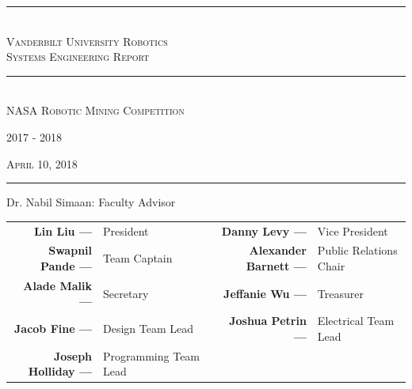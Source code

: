 \documentclass[12pt]{article}
\begin{document}
	\begin{titlepage}

\setlength{\parindent}{0cm}
\newcommand{\HRule}{\rule{\linewidth}{0.25mm}}

\vspace*{0.5in}

\vspace*{.125in}

\HRule \\[0.4cm]
	\Large\textsc{Vanderbilt University Robotics \\ Systems Engineering Report}

\HRule\\ [1.0cm]

\vspace*{0.0in}
\huge\textsc{NASA Robotic Mining Competition}

\vspace*{0.125in}

\LARGE{\textsc{2017 - 2018}}

\vspace*{0.2in}

\large{\textsc{April 10, 2018}}

\vspace*{0.1in}

\begin{center}
\rule{4.5in}{0.4pt}
\end{center}
\begin{center}
Dr. Nabil Simaan: Faculty Advisor \\
\end{center}

\vspace*{0.2in}

\centering
\small{
 \begin{tabular}{r l r l}
  \textbf{Lin Liu ---} & President  &  \textbf{Danny Levy ---} & Vice President \\
  \textbf{Swapnil Pande ---} & Team Captain  & \textbf{Alexander Barnett ---} & Public Relations Chair \\
  \textbf{Alade Malik ---} & Secretary & \textbf{Jeffanie Wu ---} & Treasurer \\
  \textbf{Jacob Fine ---} & Design Team Lead & \textbf{Joshua Petrin ---} & Electrical Team Lead \\
  \textbf{Joseph Holliday ---} & Programming Team Lead & &
 \end{tabular}
}


\end{titlepage}
\end{document}
